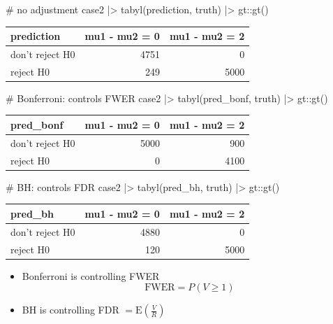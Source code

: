 \documentclass[a4paper]{article}\usepackage[]{graphicx}\usepackage[]{xcolor}
\begin{document}
\begin{Schunk}
\begin{Sinput}
# no adjustment
case2 |> tabyl(prediction, truth) |>
  gt::gt()
\end{Sinput}
\begin{longtable}{lrr}
\toprule
prediction & mu1 - mu2 = 0 & mu1 - mu2 = 2 \\ 
\midrule\addlinespace[2.5pt]
don't reject H0 & 4751 & 0 \\ 
reject H0 & 249 & 5000 \\ 
\bottomrule
\end{longtable}
\begin{Sinput}
# Bonferroni: controls FWER 
case2 |> tabyl(pred_bonf, truth) |>
  gt::gt()
\end{Sinput}
\begin{longtable}{lrr}
\toprule
pred\_bonf & mu1 - mu2 = 0 & mu1 - mu2 = 2 \\ 
\midrule\addlinespace[2.5pt]
don't reject H0 & 5000 & 900 \\ 
reject H0 & 0 & 4100 \\ 
\bottomrule
\end{longtable}
\begin{Sinput}
# BH: controls FDR 
case2 |> tabyl(pred_bh, truth) |>
  gt::gt()
\end{Sinput}
\begin{longtable}{lrr}
\toprule
pred\_bh & mu1 - mu2 = 0 & mu1 - mu2 = 2 \\ 
\midrule\addlinespace[2.5pt]
don't reject H0 & 4880 & 0 \\ 
reject H0 & 120 & 5000 \\ 
\bottomrule
\end{longtable}
\end{Schunk}
\begin{itemize}
	\item Bonferroni is controlling FWER
	\[
		\mathrm{FWER} = P(V \geq 1)
	\]
	\item BH is controlling FDR \( = \mathrm{E} \left( \frac{V}{R} \right) \) 
\end{itemize}
\end{document}
